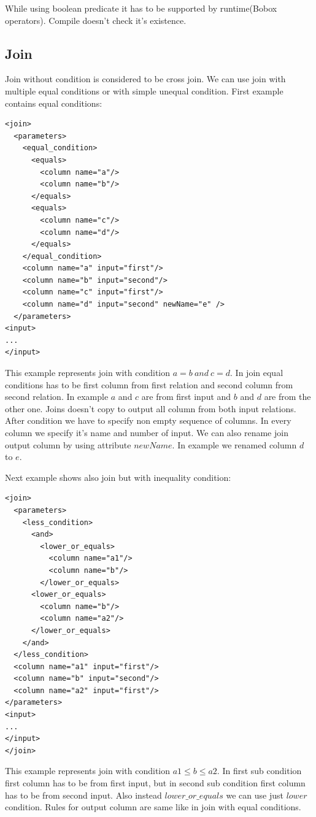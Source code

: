 While using boolean predicate it has to be supported by runtime(Bobox operators). Compile doesn't check it's existence.

\subsection{Join}

Join without condition is considered to be cross join. We can use join with multiple equal conditions or with simple unequal condition. First example contains equal conditions:

\begin{lstlisting}
<join>
  <parameters>
    <equal_condition>
      <equals>
        <column name="a"/>
        <column name="b"/>
      </equals>
      <equals>
        <column name="c"/>
        <column name="d"/>
      </equals>
    </equal_condition>
    <column name="a" input="first"/>
    <column name="b" input="second"/>
    <column name="c" input="first"/>
    <column name="d" input="second" newName="e" />
  </parameters>
<input>
...
</input>
\end{lstlisting}

This example represents join with condition $a=b~and~c=d$. In join equal conditions has to be first column from first relation and second column from second relation. In example $a$ and $c$ are from first input and $b$ and $d$ are from the other one. Joins doesn't copy to output all column from both input relations. After condition we have to specify non empty sequence of columns. In every column we specify it's name and number of input. We can also rename join output column by using attribute $newName$. In example we renamed column $d$ to $e$.

Next example shows also join but with inequality condition:

\begin{lstlisting}
<join>
  <parameters>
    <less_condition>
      <and>
        <lower_or_equals>
          <column name="a1"/>
          <column name="b"/>
        </lower_or_equals>
      <lower_or_equals>
        <column name="b"/>
        <column name="a2"/>
      </lower_or_equals>
    </and>
  </less_condition>
  <column name="a1" input="first"/>
  <column name="b" input="second"/>
  <column name="a2" input="first"/>
</parameters>
<input>
...
</input>
</join>
\end{lstlisting}
This example represents join with condition $a1\leq b\leq a2$. In first sub condition first column has to be from first input, but in second sub condition first column has to be from second input. Also instead $lower\_or\_equals$ we can use just $lower$ condition. Rules for output column are same like in join with equal conditions.


